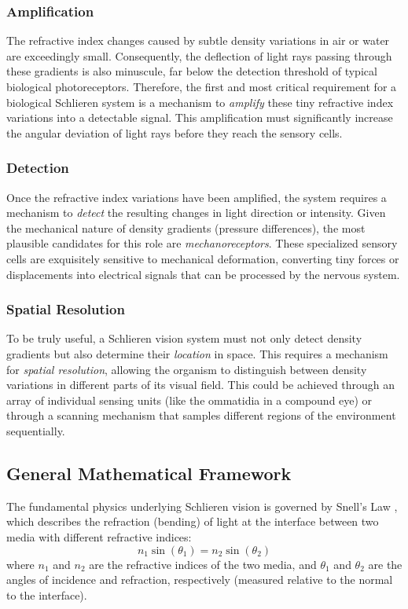\documentclass[11pt]{article}
\begin{document}
\subsubsection{Amplification}
The refractive index changes caused by subtle density variations in air or water are exceedingly small. Consequently, the deflection of light rays passing through these gradients is also minuscule, far below the detection threshold of typical biological photoreceptors. Therefore, the first and most critical requirement for a biological Schlieren system is a mechanism to \textit{amplify} these tiny refractive index variations into a detectable signal. This amplification must significantly increase the angular deviation of light rays before they reach the sensory cells.

\subsubsection{Detection}
Once the refractive index variations have been amplified, the system requires a mechanism to \textit{detect} the resulting changes in light direction or intensity. Given the mechanical nature of density gradients (pressure differences), the most plausible candidates for this role are \textit{mechanoreceptors}. These specialized sensory cells are exquisitely sensitive to mechanical deformation, converting tiny forces or displacements into electrical signals that can be processed by the nervous system.

\subsubsection{Spatial Resolution}
To be truly useful, a Schlieren vision system must not only detect density gradients but also determine their \textit{location} in space. This requires a mechanism for \textit{spatial resolution}, allowing the organism to distinguish between density variations in different parts of its visual field. This could be achieved through an array of individual sensing units (like the ommatidia in a compound eye) or through a scanning mechanism that samples different regions of the environment sequentially.

\subsection{General Mathematical Framework}

The fundamental physics underlying Schlieren vision is governed by Snell's Law \cite{Hecht2017Optics}, which describes the refraction (bending) of light at the interface between two media with different refractive indices:
\[n_1\sin(\theta_1) = n_2\sin(\theta_2)\]
where $n_1$ and $n_2$ are the refractive indices of the two media, and $\theta_1$ and $\theta_2$ are the angles of incidence and refraction, respectively (measured relative to the normal to the interface).
\end{document}
